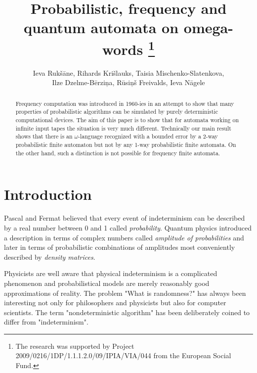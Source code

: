 \documentclass{llncs}
\begin{document}
\title{Probabilistic, frequency and quantum  automata on omega-words
\thanks{%
The research was supported by  Project 2009/0216/1DP/1.1.1.2.0/09/IPIA/VIA/044
from the 
European Social Fund.
} 
}

\author{
Ieva Ruk\v s\= ane,
Rihards Kri\v slauks,
Taisia Mischenko-Slatenkova,\\
Ilze Dzelme-B\= erzi\c na,
R\= usi\c n\v s Freivalds,
Ieva N\= agele}

\maketitle

\begin{abstract}  Frequency computation was introduced in 1960-ies in an attempt to show that many properties of probabilistic algorithms can be simulated by purely deterministic computational devices. The aim of this paper is to show that for automata working on infinite input tapes the situation is very much different. Technically our main result shows that there is an $\omega$-language recognized with a bounded error by a 2-way probabilistic finite automaton but not by any 1-way probabilistic finite automata. On the other hand, such a distinction is not possible for frequency finite automata.

\end{abstract} 

\section{Introduction}


Pascal and Fermat believed that every event of indeterminism can be described by a real number between 0 and 1 called 
{\em probability}. Quantum physics introduced a description in terms of complex numbers called {\em amplitude of 
probabilities} and later in terms of probabilistic combinations of amplitudes most conveniently described by {\em density
matrices}.




Physicists are well aware that physical indeterminism is a complicated phenomenon and probabilistical models are merely reasonably good approximations of reality. The problem "What is randomness?" has always been interesting not only for philosophers and physicists but also for computer scientists. The term "nondeterministic algorithm" has been deliberately coined  to differ from "indeterminism".
\end{document}

